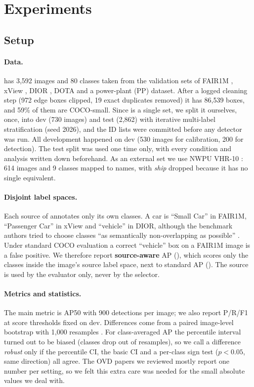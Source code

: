 \section{Experiments}
\label{sec:exp}

\subsection{Setup}
\paragraph{Data.}
\lae \cite{pan2025lae} has 3,592 images and 80 classes taken from the validation sets of FAIR1M \cite{sun2022fair1m}, xView \cite{lam2018xview}, DIOR \cite{li2020dior}, DOTA \cite{xia2018dota} and a power-plant (PP) dataset.
After a logged cleaning step (972 edge boxes clipped, 19 exact duplicates removed) it has 86,539 boxes, and 59\% of them are COCO-small.
Since \lae is a single set, we split it ourselves, once, into dev (730 images) and test (2,862) with iterative multi-label stratification \cite{sechidis2011stratification} (seed 2026), and the ID lists were committed before any detector was run.
All development happened on dev (530 images for calibration, 200 for detection).
The test split was used one time only, with every condition and analysis written down beforehand.
As an external set we use NWPU VHR-10 \cite{cheng2014nwpu}: 614 images and 9 classes mapped to \lae names, with \emph{ship} dropped because it has no single equivalent.

\paragraph{Disjoint label spaces.}
Each source of \lae annotates only its own classes.
A car is ``Small Car'' in FAIR1M, ``Passenger Car'' in xView and ``vehicle'' in DIOR, although the benchmark authors tried to choose classes ``as semantically non-overlapping as possible'' \cite{pan2025lae}.
Under standard COCO evaluation \cite{lin2014coco} a correct ``vehicle'' box on a FAIR1M image is a false positive.
We therefore report \textbf{source-aware} AP (\src), which scores only the classes inside the image's source label space, next to standard AP (\std).
The source is used by the evaluator only, never by the selector.

\paragraph{Metrics and statistics.}
The main metric is AP50 with 900 detections per image; we also report P/R/F1 at score thresholds fixed on dev.
Differences come from a paired image-level bootstrap with 1,000 resamples \cite{efron1993bootstrap}.
For class-averaged AP the percentile interval turned out to be biased (classes drop out of resamples), so we call a difference \emph{robust} only if the percentile CI, the basic CI and a per-class sign test ($p<0.05$, same direction) all agree.
The OVD papers we reviewed mostly report one number per setting, so we felt this extra care was needed for the small absolute values we deal with.

